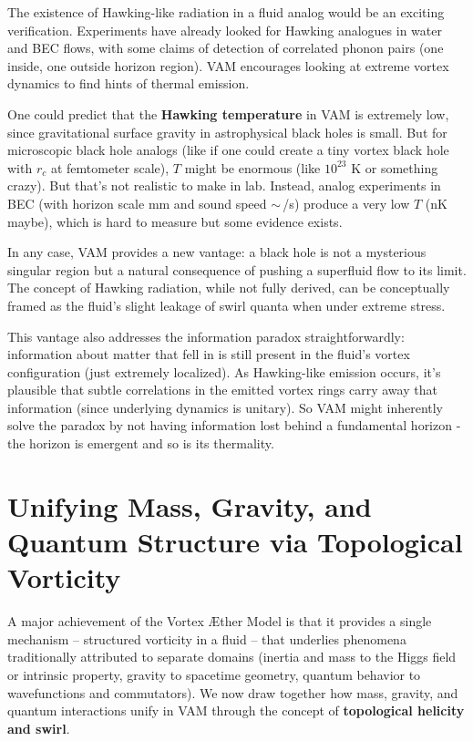 \documentclass[a4paper,12pt]{article}
\begin{document}
    The existence of Hawking-like radiation in a fluid analog would be an exciting verification. Experiments have already looked for Hawking analogues in water and BEC flows, with some claims of detection of correlated phonon pairs (one inside, one outside horizon region). VAM encourages looking at extreme vortex dynamics to find hints of thermal emission.

    One could predict that the \textbf{Hawking temperature} in VAM is extremely low, since gravitational surface gravity in astrophysical black holes is small. But for microscopic black hole analogs (like if one could create a tiny vortex black hole with $r_c$ at femtometer scale), $T$ might be enormous (like $10^{23}$ K or something crazy). But that’s not realistic to make in lab. Instead, analog experiments in BEC (with horizon scale mm and sound speed $\sim\,$/s) produce a very low $T$ (nK maybe), which is hard to measure but some evidence exists.

    In any case, VAM provides a new vantage: a black hole is not a mysterious singular region but a natural consequence of pushing a superfluid flow to its limit. The concept of Hawking radiation, while not fully derived, can be conceptually framed as the fluid’s slight leakage of swirl quanta when under extreme stress.

    This vantage also addresses the information paradox straightforwardly: information about matter that fell in is still present in the fluid’s vortex configuration (just extremely localized). As Hawking-like emission occurs, it’s plausible that subtle correlations in the emitted vortex rings carry away that information (since underlying dynamics is unitary). So VAM might inherently solve the paradox by not having information lost behind a fundamental horizon - the horizon is emergent and so is its thermality.

\section{Unifying Mass, Gravity, and Quantum Structure via Topological Vorticity}
    A major achievement of the Vortex Æther Model is that it provides a single mechanism -- structured vorticity in a fluid -- that underlies phenomena traditionally attributed to separate domains (inertia and mass to the Higgs field or intrinsic property, gravity to spacetime geometry, quantum behavior to wavefunctions and commutators). We now draw together how mass, gravity, and quantum interactions unify in VAM through the concept of \textbf{topological helicity and swirl}.
\end{document}

